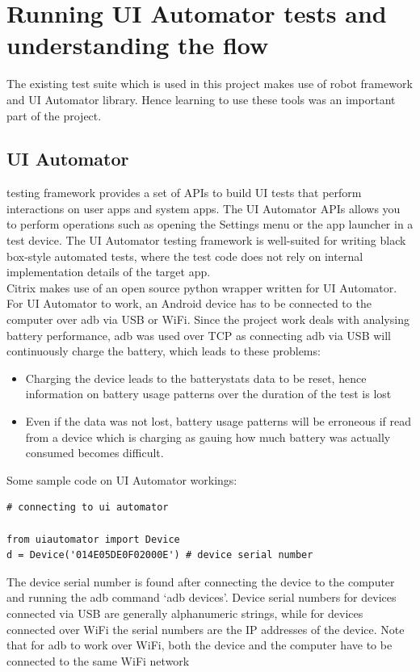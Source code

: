 \section{Running UI Automator tests and understanding the flow} The existing test suite which is used in this project makes use of robot framework and UI Automator library. Hence learning to use these tools was an important part of the project. \\

\subsection{UI Automator} testing framework provides a set of APIs to build UI tests that perform interactions on user apps and system apps. The UI Automator APIs allows you to perform operations such as opening the Settings menu or the app launcher in a test device. The UI Automator testing framework is well-suited for writing black box-style automated tests, where the test code does not rely on internal implementation details of the target app.\cite{uiautomator} \\

Citrix makes use of an open source python wrapper written for UI Automator. For UI Automator to work, an Android device has to be connected to the computer over adb via USB or WiFi. Since the project work deals with analysing battery performance, adb was used over TCP as connecting adb via USB will continuously charge the battery, which leads to these problems:
\begin{itemize}
	\item Charging the device leads to the batterystats data to be reset, hence information on battery usage patterns over the duration of the test is lost
	\item Even if the data was not lost, battery usage patterns will be erroneous if read from a device which is charging as gauing how much battery was actually consumed becomes difficult.
\end{itemize}	 

Some sample code on UI Automator workings:

\begin{lstlisting}[style=PyStyle]
# connecting to ui automator

from uiautomator import Device
d = Device('014E05DE0F02000E') # device serial number 
\end{lstlisting}

The device serial number is found after connecting the device to the computer and running the adb command `adb devices'. Device serial numbers for devices connected via USB are generally alphanumeric strings, while for devices connected over WiFi the serial numbers are the IP addresses of the device. Note that for adb to work over WiFi, both the device and the computer have to be connected to the same WiFi network

